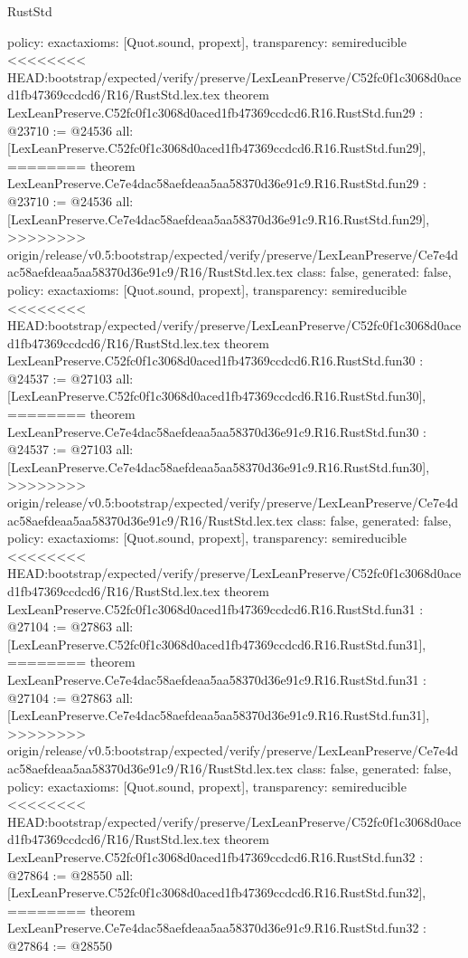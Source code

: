\begin{lexlean}{RustStd}
\begin{coremodule}
{\begin{coremodule}
{{{{{{{{{{{{{{{{{{{{{{{{{{{{{{{{  policy: exact{axioms: [Quot.sound, propext]},
  transparency: semireducible
}
<<<<<<<< HEAD:bootstrap/expected/verify/preserve/LexLeanPreserve/C52fc0f1c3068d0aced1fb47369ccdcd6/R16/RustStd.lex.tex
theorem LexLeanPreserve.C52fc0f1c3068d0aced1fb47369ccdcd6.R16.RustStd.fun29 : @23710 := @24536 {
  all: [LexLeanPreserve.C52fc0f1c3068d0aced1fb47369ccdcd6.R16.RustStd.fun29],
========
theorem LexLeanPreserve.Ce7e4dac58aefdeaa5aa58370d36e91c9.R16.RustStd.fun29 : @23710 := @24536 {
  all: [LexLeanPreserve.Ce7e4dac58aefdeaa5aa58370d36e91c9.R16.RustStd.fun29],
>>>>>>>> origin/release/v0.5:bootstrap/expected/verify/preserve/LexLeanPreserve/Ce7e4dac58aefdeaa5aa58370d36e91c9/R16/RustStd.lex.tex
  class: false,
  generated: false,
  policy: exact{axioms: [Quot.sound, propext]},
  transparency: semireducible
}
<<<<<<<< HEAD:bootstrap/expected/verify/preserve/LexLeanPreserve/C52fc0f1c3068d0aced1fb47369ccdcd6/R16/RustStd.lex.tex
theorem LexLeanPreserve.C52fc0f1c3068d0aced1fb47369ccdcd6.R16.RustStd.fun30 : @24537 := @27103 {
  all: [LexLeanPreserve.C52fc0f1c3068d0aced1fb47369ccdcd6.R16.RustStd.fun30],
========
theorem LexLeanPreserve.Ce7e4dac58aefdeaa5aa58370d36e91c9.R16.RustStd.fun30 : @24537 := @27103 {
  all: [LexLeanPreserve.Ce7e4dac58aefdeaa5aa58370d36e91c9.R16.RustStd.fun30],
>>>>>>>> origin/release/v0.5:bootstrap/expected/verify/preserve/LexLeanPreserve/Ce7e4dac58aefdeaa5aa58370d36e91c9/R16/RustStd.lex.tex
  class: false,
  generated: false,
  policy: exact{axioms: [Quot.sound, propext]},
  transparency: semireducible
}
<<<<<<<< HEAD:bootstrap/expected/verify/preserve/LexLeanPreserve/C52fc0f1c3068d0aced1fb47369ccdcd6/R16/RustStd.lex.tex
theorem LexLeanPreserve.C52fc0f1c3068d0aced1fb47369ccdcd6.R16.RustStd.fun31 : @27104 := @27863 {
  all: [LexLeanPreserve.C52fc0f1c3068d0aced1fb47369ccdcd6.R16.RustStd.fun31],
========
theorem LexLeanPreserve.Ce7e4dac58aefdeaa5aa58370d36e91c9.R16.RustStd.fun31 : @27104 := @27863 {
  all: [LexLeanPreserve.Ce7e4dac58aefdeaa5aa58370d36e91c9.R16.RustStd.fun31],
>>>>>>>> origin/release/v0.5:bootstrap/expected/verify/preserve/LexLeanPreserve/Ce7e4dac58aefdeaa5aa58370d36e91c9/R16/RustStd.lex.tex
  class: false,
  generated: false,
  policy: exact{axioms: [Quot.sound, propext]},
  transparency: semireducible
}
<<<<<<<< HEAD:bootstrap/expected/verify/preserve/LexLeanPreserve/C52fc0f1c3068d0aced1fb47369ccdcd6/R16/RustStd.lex.tex
theorem LexLeanPreserve.C52fc0f1c3068d0aced1fb47369ccdcd6.R16.RustStd.fun32 : @27864 := @28550 {
  all: [LexLeanPreserve.C52fc0f1c3068d0aced1fb47369ccdcd6.R16.RustStd.fun32],
========
theorem LexLeanPreserve.Ce7e4dac58aefdeaa5aa58370d36e91c9.R16.RustStd.fun32 : @27864 := @28550 {
}}}}}}}}}}}}}}}}}}}}}}}}}}}}}}}}}}}}
\end{coremodule}}
\end{coremodule}
\end{lexlean}
